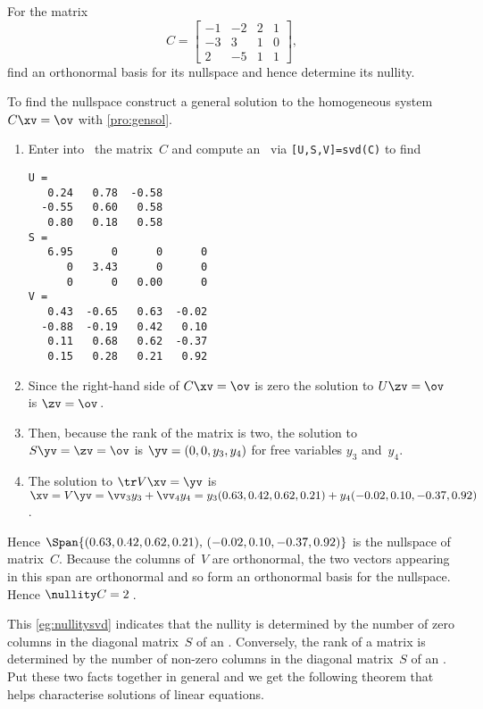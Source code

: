 \begin{example} \label{eg:nullitysvd}
For the matrix
\begin{equation*}
C=\begin{bmatrix} -1&-2&2&1
\\-3&3&1&0
\\2&-5&1&1 \end{bmatrix},
\end{equation*}
find an orthonormal basis for its nullspace and hence determine its nullity.
\begin{solution} 
To find the nullspace construct a general solution to the homogeneous system \(C\xv=\ov\) with \autoref{pro:gensol}.
\begin{enumerate}
\item Enter  into \script\ the matrix~\(C\) and compute an \svd\ via \verb|[U,S,V]=svd(C)| to find \twodp
\setbox\ajrqrbox\hbox{}%
\marginpar{\usebox{\ajrqrbox}}%
\begin{verbatim}
U =
   0.24   0.78  -0.58
  -0.55   0.60   0.58
   0.80   0.18   0.58
S =
   6.95      0      0      0
      0   3.43      0      0
      0      0   0.00      0
V =
   0.43  -0.65   0.63  -0.02
  -0.88  -0.19   0.42   0.10
   0.11   0.68   0.62  -0.37
   0.15   0.28   0.21   0.92
\end{verbatim}
\item Since the right-hand side of \(C\xv=\ov\) is zero the solution to \(U\zv=\ov\) is \(\zv=\ov\)\,.
\item Then, because the rank of the matrix is two, the solution to \(S\yv=\zv=\ov\) is \(\yv=(0,0,y_3,y_4)\) for free variables \(y_3\) and~\(y_4\).
\item The solution to \(\tr V\xv=\yv\) is \(\xv=V\yv=\vv_3y_3+\vv_4y_4
=y_3(0.63,0.42,0.62,0.21)+y_4(-0.02,0.10,-0.37,0.92)\).
\end{enumerate}
Hence  \(\Span\{(0.63,0.42,0.62,0.21),\,(-0.02,0.10,-0.37,0.92)\}\) is the nullspace of matrix~\(C\).
Because the columns of~\(V\) are orthonormal, the two vectors appearing in this span are orthonormal and so form an orthonormal basis for the nullspace.
Hence \(\nullity C=2\)\,.
\end{solution}
\end{example}



This \autoref{eg:nullitysvd} indicates that the nullity is determined by the number of zero columns in the diagonal matrix~\(S\) of an \svd.
Conversely, the rank of a matrix is determined by the number of non-zero columns in the diagonal matrix~\(S\) of an \svd.
Put these two facts together in general and we get the following theorem that helps characterise solutions of linear equations.





